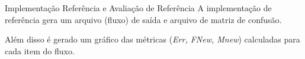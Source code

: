 \documentclass[aspectratio=43,10pt]{beamer}
\begin{document}







\begin{frame}[fragile]{Implementação Referência e Avaliação de Referência}
  A implementação de referência gera um arquivo (fluxo) de saída e arquivo de
  matriz de confusão.

  Além disso é gerado um gráfico das métricas (\textit{Err, FNew, Mnew}) calculadas para cada item do fluxo.
\end{frame}
\end{document}
